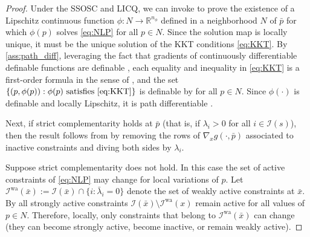 \documentclass[journal,twoside,web,final]{ieeecolor}
\theoremstyle{definition}
\newcommand{\R}{\mathbb{R}}
\begin{document}
\begin{proof}
Under the SSOSC and LICQ, we can invoke \cite[Theorem 2.3.3]{jittorntrum1978sequential} to prove the existence of a Lipschitz continuous function $\phi:N \to \R^{n_\phi}$ defined in a neighborhood $N$ of $\bar{p}$ for which $\phi(p)$ solves \cref{eq:NLP} for all $p\in N$. Since the solution map is locally unique, it must be the unique solution of the KKT conditions \cref{eq:KKT}. By \cref{ass:path_diff}, leveraging the fact that gradients of continuously differentiable definable functions are definable \cite[Proposition B.7(3)]{vandenDries1996geometric}, each equality and inequality in \cref{eq:KKT} is a first-order formula in the sense of \cite{coste1999introduction}, and the set $\{ (p,\phi(p)): \phi(p) \text{ satisfies } \ref{eq:KKT} \}$ is definable by \cite[Theorem 1.13]{coste1999introduction} for all $p\in N$. Since $\phi(\cdot)$ is definable and locally Lipschitz, it is path differentiable \cite[Proposition 2]{bolte2021conservative}.

Next, if strict complementarity holds at $\bar{p}$ (that is, if $\lambda_i>0$ for all $i\in \mathcal{I}(s)$), then the result follows from \cite[Corollary 2.3.1]{jittorntrum1978sequential} by removing the rows of $\nabla_x g(\cdot,\bar{p})$ associated to inactive constraints and diving both sides by $\lambda_i$.

Suppose strict complementarity does not hold. In this case the set of active constraints of \cref{eq:NLP} may change for local variations of $p$. Let $\mathcal{I}^\text{wa}(\bar{x}):=\mathcal{I}(\bar{x})\cap\{i:\bar{\lambda}_i=0\}$ denote the set of weakly active constraints at $\bar{x}$. By \cite[Lemma 2.2.2]{jittorntrum1978sequential} all strongly active constraints $\mathcal{I}(\bar{x}) \setminus \mathcal{I}^\text{wa}(x)$ remain active for all values of $p\in N$. Therefore, locally, only constraints that belong to $\mathcal{I}^\text{wa}(\bar{x})$ can change (they can become strongly active, become inactive, or remain weakly active).


\end{proof}
\end{document}

